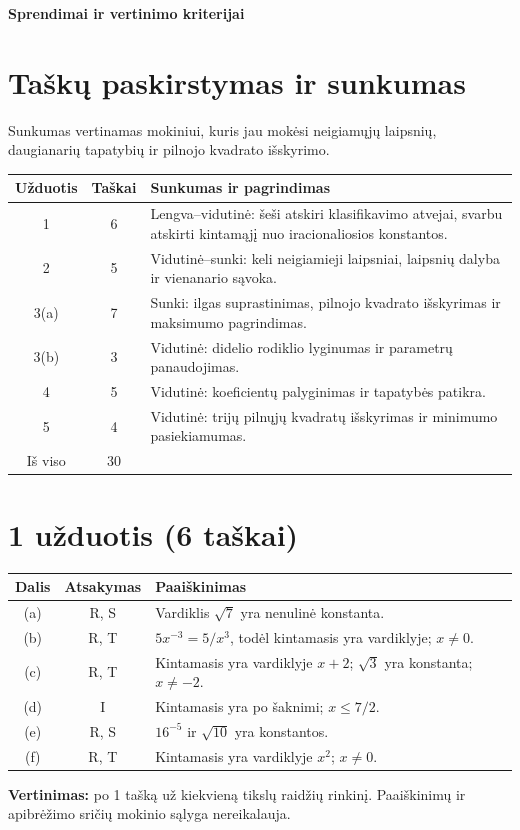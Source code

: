 \documentclass[12pt,a4paper]{exam}
\begin{document}
\begin{center}\Large\textbf{Sprendimai ir vertinimo kriterijai}\end{center}
\section*{Taškų paskirstymas ir sunkumas}
Sunkumas vertinamas mokiniui, kuris jau mokėsi neigiamųjų laipsnių, daugianarių tapatybių ir pilnojo kvadrato išskyrimo.
\begin{center}\begin{tabular}{|c|c|p{10cm}|}\hline
Užduotis & Taškai & Sunkumas ir pagrindimas\\\hline
1 & 6 & Lengva--vidutinė: šeši atskiri klasifikavimo atvejai, svarbu atskirti kintamąjį nuo iracionaliosios konstantos.\\\hline
2 & 5 & Vidutinė--sunki: keli neigiamieji laipsniai, laipsnių dalyba ir vienanario sąvoka.\\\hline
3(a) & 7 & Sunki: ilgas suprastinimas, pilnojo kvadrato išskyrimas ir maksimumo pagrindimas.\\\hline
3(b) & 3 & Vidutinė: didelio rodiklio lyginumas ir parametrų panaudojimas.\\\hline
4 & 5 & Vidutinė: koeficientų palyginimas ir tapatybės patikra.\\\hline
5 & 4 & Vidutinė: trijų pilnųjų kvadratų išskyrimas ir minimumo pasiekiamumas.\\\hline
Iš viso & 30 & \\\hline
\end{tabular}\end{center}
\section*{1 užduotis (6 taškai)}
\begin{center}
\begin{tabular}{|c|c|p{11cm}|}\hline
Dalis & Atsakymas & Paaiškinimas\\\hline
(a) & R, S & Vardiklis $\sqrt7$ yra nenulinė konstanta.\\\hline
(b) & R, T & $5x^{-3}=5/x^3$, todėl kintamasis yra vardiklyje; $x\ne0$.\\\hline
(c) & R, T & Kintamasis yra vardiklyje $x+2$; $\sqrt3$ yra konstanta; $x\ne-2$.\\\hline
(d) & I & Kintamasis yra po šaknimi; $x\leq7/2$.\\\hline
(e) & R, S & $16^{-5}$ ir $\sqrt{10}$ yra konstantos.\\\hline
(f) & R, T & Kintamasis yra vardiklyje $x^2$; $x\ne0$.\\\hline
\end{tabular}\end{center}
\textbf{Vertinimas:} po 1 tašką už kiekvieną tikslų raidžių rinkinį. Paaiškinimų ir apibrėžimo sričių mokinio sąlyga nereikalauja.
\end{document}
